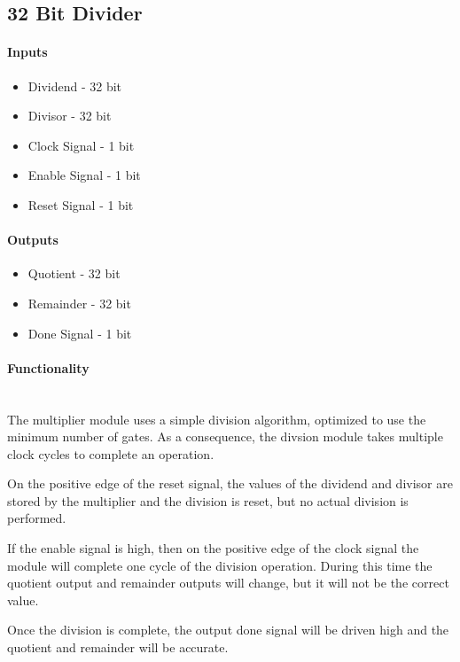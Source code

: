 \documentclass{article}
\begin{document}
    \subsection{32 Bit Divider}

    \paragraph{Inputs}
    \begin{itemize}
        \item Dividend - 32 bit
        \item Divisor - 32 bit
        \item Clock Signal - 1 bit
        \item Enable Signal - 1 bit
        \item Reset Signal - 1 bit
    \end{itemize}

    \paragraph{Outputs}
    \begin{itemize}
        \item Quotient - 32 bit
        \item Remainder - 32 bit
        \item Done Signal - 1 bit
    \end{itemize}

    \paragraph{Functionality}
    \hfill\\
    The multiplier module uses a simple division algorithm, optimized
    to use the minimum number of gates. As a consequence, the divsion
    module takes multiple clock cycles to complete an operation.

    On the positive edge of the reset signal, the values of the dividend
    and divisor are stored by the multiplier and the division is
    reset, but no actual division is performed.

    If the enable signal is high, then on the positive edge of the clock
    signal the module will complete one cycle of the division 
    operation. During this time the quotient output and remainder outputs
    will change, but it will not be the correct value.

    Once the division is complete, the output done signal will be driven
    high and the quotient and remainder will be accurate.
\end{document}
